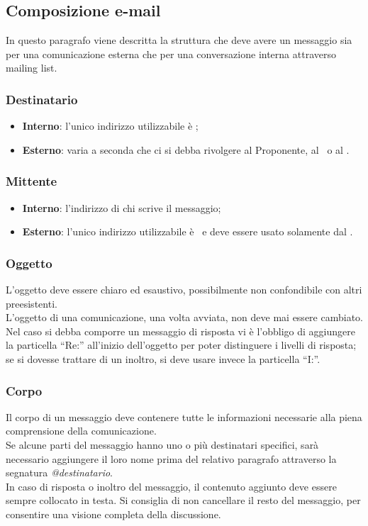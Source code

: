 \documentclass[../NormeDiProgetto.tex]{subfiles}
\begin{document}
			\subsection{Composizione e-mail}
				In questo paragrafo viene descritta la struttura che deve avere
				un messaggio sia per una comunicazione esterna che per una
				conversazione interna attraverso mailing list.
				\subsubsection{Destinatario}
					\begin{itemize}
						\item \textbf{Interno}: l'unico indirizzo utilizzabile è
						\mailkaleidoscode;
						\item \textbf{Esterno}: varia a seconda che ci si debba
						rivolgere  al Proponente, al \vardanega\ o al \cardin.
					\end{itemize}
				\subsubsection{Mittente}
					\begin{itemize}
						\item \textbf{Interno}: l'indirizzo di chi scrive
						il messaggio;
						\item \textbf{Esterno}: l'unico indirizzo utilizzabile è
						\mailkaleidoscode\ e deve essere usato solamente dal
						\responsabilediprogetto.
					\end{itemize}
				\subsubsection{Oggetto}
					L'oggetto deve essere chiaro ed esaustivo, possibilmente non
					confondibile con altri preesistenti.\\
					L'oggetto di una comunicazione, una volta avviata, non deve mai essere cambiato.\\
					Nel caso si debba comporre un messaggio di risposta vi è l'obbligo di aggiungere la
					particella ``Re:'' all'inizio dell'oggetto per poter distinguere i
					livelli di risposta; se si dovesse trattare di un inoltro, si deve
					usare invece la particella ``I:''.
				\subsubsection{Corpo}
					Il corpo di un messaggio deve contenere tutte le informazioni
					necessarie alla piena comprensione della comunicazione.\\
					Se alcune parti del messaggio hanno uno o più destinatari specifici,
					sarà necessario aggiungere il loro nome	prima del relativo paragrafo
					attraverso la segnatura	\textit{@destinatario}.\\
					In caso di risposta o inoltro del messaggio, il contenuto aggiunto deve
					essere sempre collocato in testa.
					Si consiglia di non cancellare il resto del messaggio,
					per consentire una visione completa della discussione.
\end{document}
